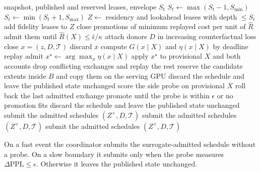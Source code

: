 \begin{algorithm}[tbh]
\caption{One \systemname\ control event.}
\label{alg:period}
\begin{algorithmic}[1]
\Require snapshot, published and reserved leases, envelope \(S_t\)
  \State \(S_t\gets\max(S_t-1,S_{\min})\)
  \State \(S_t\gets\min(S_t+1,S_{\max})\)
\EndIf
\State \(Z\gets\) residency and lookahead leases with depth \(\le S_t\)
  \State add fidelity leases to \(Z\)
\EndIf
{}
  \State close promotions of minimum replayed cost per unit of \(\widehat R\)
  \State admit them until \(\widehat R(X)\le\widehat\epsilon/\kappa\)
\EndIf
{}
  \State attach donors \(D\) in increasing counterfactual loss
  \State close \(x=(z,D,\mathcal T)\)
    \State discard \(x\)
  \Else
    \State compute \(G(x\mid X)\) and \(\eta(x\mid X)\) by deadline replay
  \EndIf
\EndFor
{}
  \State admit \(x^\star\gets\arg\max_x\eta(x\mid X)\)
  \State apply \(x^\star\) to provisional \(X\) and both accounts
  \State drop conflicting exchanges and replay the rest
\EndWhile
{}
  \State reserve the candidate extents inside \(B\) and copy them on the serving GPU
    \State discard the schedule and leave the published state unchanged
  \Else
    \State score the side probe on provisional \(X\)
      \State roll back the last admitted exchange
      \State promote until the probe is within \(\epsilon\) or no promotion fits
        \State discard the schedule and leave the published state unchanged
      \Else
        \State submit the admitted schedules \((Z^+,D,\mathcal T)\)
      \EndIf
    \Else
      \State submit the admitted schedules \((Z^+,D,\mathcal T)\)
    \EndIf
  \EndIf
\Else
  \State submit the admitted schedules \((Z^+,D,\mathcal T)\)
\EndIf
\end{algorithmic}
\end{algorithm}

On a fast event the coordinator submits the surrogate-admitted schedule without a probe. On a slow boundary it submits only when the probe measures \(\Delta\mathrm{PPL}\le\epsilon\). Otherwise it leaves the published state unchanged.

